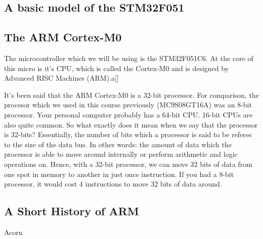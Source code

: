 \subsection{A basic model of the STM32F051}

\subsection{The ARM Cortex-M0}
The microcontroller which we will be using is the STM32F051C6. At the core of this micro is it's CPU, which is called the Cortex-M0 and is designed by Advanced RISC Machines (ARM).a]]

It's been said that the ARM Cortex-M0 is a 32-bit processor. For comparison, the procesor which we used in this course previously (MC9S08GT16A) was an 8-bit processor. Your personal computer probably has a 64-bit CPU. 16-bit CPUs are also quite common. So what exactly does it mean when we say that the processor is 32-bits? Essentially, the number of bits which a processor is said to be referes to the size of the data bus. In other words: the amount of data which the processor is able to move around internally or perform arithmetic and logic operations on. Hence, with a 32-bit processor, we can move 32 bits of data from one spot in memory to another in just once instruction. If you had a 8-bit processor, it would cost 4 instructions to move 32 bits of data around.  



\subsection{A Short History of ARM}
Acorn

